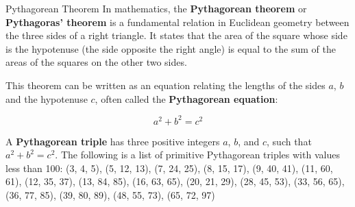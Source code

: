 \documentclass{beamer}
\begin{document}
 
 
\begin{frame}{Pythagorean Theorem} 
 In mathematics, the \textbf{Pythagorean theorem} or \textbf{Pythagoras' theorem} is a fundamental relation in Euclidean geometry between the three sides of a right triangle. It states that the area of the square whose side is the hypotenuse (the side opposite the right angle) is equal to the sum of the areas of the squares on the other two sides. 
 
\pause 
 
This theorem can be written as an equation relating the lengths of the sides $a$, $b$ and the hypotenuse $c$, often called the \textbf{Pythagorean equation}:

\pause
\[ 
  a^2 + b^2 = c^2 
\] 
 
\pause 
 
A \textbf{Pythagorean triple} has three positive integers $a$, $b$, and $c$, such that $a^2 + b^2 = c^2$.
The following is a list of primitive Pythagorean triples with values less than 100:
(3, 4, 5), (5, 12, 13), (7, 24, 25), (8, 15, 17), (9, 40, 41), (11, 60, 61), (12, 35, 37), (13, 84, 85), (16, 63, 65), (20, 21, 29), (28, 45, 53), (33, 56, 65), (36, 77, 85), (39, 80, 89), (48, 55, 73), (65, 72, 97)
 
\end{frame} 
 
\end{document}
